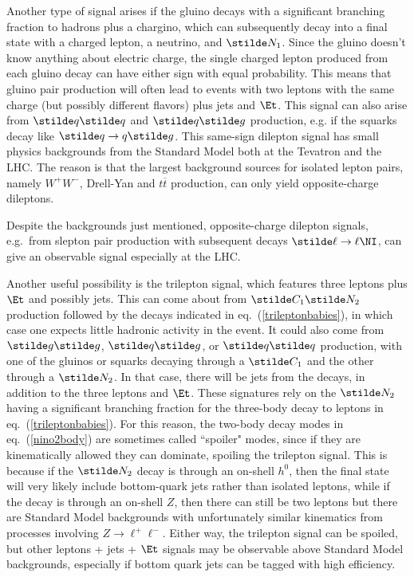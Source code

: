 Another type of signal arises if
the gluino decays with a significant branching fraction
to hadrons plus a chargino, which can subsequently
decay into a final state with a charged
lepton, a neutrino, and $\stilde N_1$. Since the gluino doesn't know
anything about
electric charge, the
single charged lepton produced from each gluino decay can have either sign
with equal probability. This means that
gluino pair production will often
lead to events with two leptons with the same charge
(but possibly different flavors) plus jets and $\Et$.
This signal can also arise from $\stilde q\stilde q$ and $\stilde q
\stilde g$ production, e.g. if the squarks decay like
$\stilde q \rightarrow q\stilde g$.
This same-sign
dilepton signal \cite{likesigndilepton} has small
physics backgrounds from
the Standard Model both at the Tevatron and the LHC.
The reason is that the largest background sources for isolated
lepton pairs, namely $W^+W^-$, Drell-Yan and $t\overline t$ production,
can only yield opposite-charge dileptons.

Despite the backgrounds just mentioned, opposite-charge dilepton signals,
e.g.~from slepton pair production with subsequent decays $\stilde \ell
\rightarrow \ell \NI$, can give an observable signal especially at the
LHC.

Another useful possibility is the trilepton signal,\cite{trilepton} which
features three leptons plus $\Et$ and possibly jets.
This can come about from $\stilde C_1\stilde N_2$ production
followed by the decays indicated in eq.~(\ref{trileptonbabies}),
in which case one expects little hadronic activity
in the event. It could also come from $\stilde g\stilde g$,
$\stilde q\stilde g$, or $\stilde q \stilde q$ production,
with one of the gluinos or squarks decaying through a $\stilde C_1$
and the other through a $\stilde N_2$. In that case, there
will be jets from the decays, in addition to the three leptons and $\Et$.
These signatures rely on the $\stilde N_2$ having a significant
branching fraction for the three-body decay to leptons in
eq.~(\ref{trileptonbabies}).
For this reason, the two-body decay modes in
eq.~(\ref{nino2body})
are sometimes called ``spoiler" modes, since if they are kinematically
allowed they can dominate, spoiling the trilepton signal.
This is because if
the $\stilde N_2$ decay is through
an on-shell $h^0$, then the final state will very likely include
bottom-quark jets rather than isolated leptons, while if
the decay is through
an on-shell $Z$, then there can still be two leptons but there are Standard
Model backgrounds with unfortunately
similar kinematics from processes
involving $Z\rightarrow \ell^+\ell^-$. Either way,
the trilepton signal can be spoiled, but other leptons + jets + $\Et$
signals may be observable above Standard Model backgrounds, especially
if bottom quark jets can be tagged with high efficiency.

